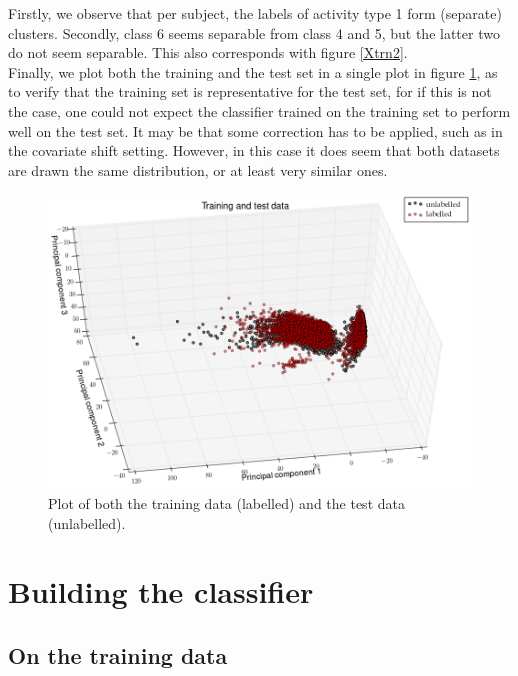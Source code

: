 \documentclass [a4paper] {report}
\begin{document}
	\noindent
	Firstly, we observe that per subject, the labels of activity type 1 form (separate) clusters. Secondly, class 6 seems separable from class 4 and 5, but the latter two do not seem separable. This also corresponds with figure \ref{Xtrn2}. \\
	
	\noindent
	Finally, we plot both the training and the test set in a single plot in figure \ref{Xall}, as to verify that the training set is representative for the test set, for if this is not the case, one could not expect the classifier trained on the training set to perform well on the test set. It may be that some correction has to be applied, such as in the covariate shift setting. However, in this case it does seem that both datasets are drawn the same distribution, or at least very similar ones. 
	
	\begin{figure}[H]
		\begin{center}
			\includegraphics[scale=0.35]{Images/Xall.png}
			\caption{Plot of both the training data (labelled) and the test data (unlabelled).}
			\label{Xall}
		\end{center}
	\end{figure}
	
	
	
	\section*{Building the classifier}
	
	\subsection*{On the training data}
	
\end{document}
